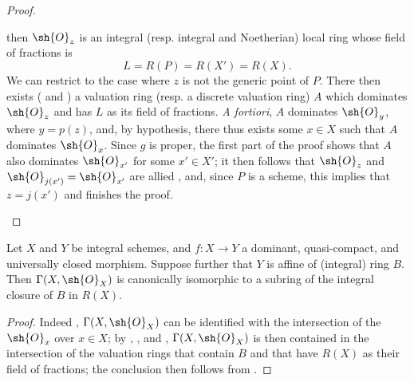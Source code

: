 \begin{proof}
\begin{enumerate}
        then $\sh{O}_z$ is an integral (resp. integral and Noetherian) local ring whose field of fractions is
        \[
            L = R(P) = R(X') = R(X).
        \]
        We can restrict to the case where $z$ is not the generic point of $P$.
        There then exists ( and ) a valuation ring (resp. a discrete valuation ring) $A$ which dominates $\sh{O}_z$ and has $L$ as its field of fractions.
        \emph{A fortiori}, $A$ dominates $\sh{O}_y$, where $y=p(z)$, and, by hypothesis, there thus exists some $x\in X$ such that $A$ dominates $\sh{O}_x$.
        Since $g$ is proper, the first part of the proof shows that $A$ also dominates $\sh{O}_{x'}$ for some $x'\in X'$;
        it then follows that $\sh{O}_z$ and $\sh{O}_{j(x')}=\sh{O}_{x'}$ are allied , and, since $P$ is a scheme, this implies that $z=j(x')$  and finishes the proof.
\end{enumerate}
\end{proof}

\begin{corollary}[7.3.11]
\label{II.7.3.11}
Let $X$ and $Y$ be integral schemes, and $f:X\to Y$ a dominant, quasi-compact, and universally closed morphism.
Suppose further that $Y$ is affine of (integral) ring $B$.
Then $\Gamma(X,\sh{O}_X)$ is canonically isomorphic to a subring of the integral closure of $B$ in $R(X)$.
\end{corollary}

\begin{proof}
Indeed , $\Gamma(X,\sh{O}_X)$ can be identified with the intersection of the $\sh{O}_x$ over $x\in X$;
by , , and , $\Gamma(X,\sh{O}_X)$ is then contained in the intersection of the valuation rings that contain $B$ and that have $R(X)$ as their field of fractions;
the conclusion then follows from .
\end{proof}

